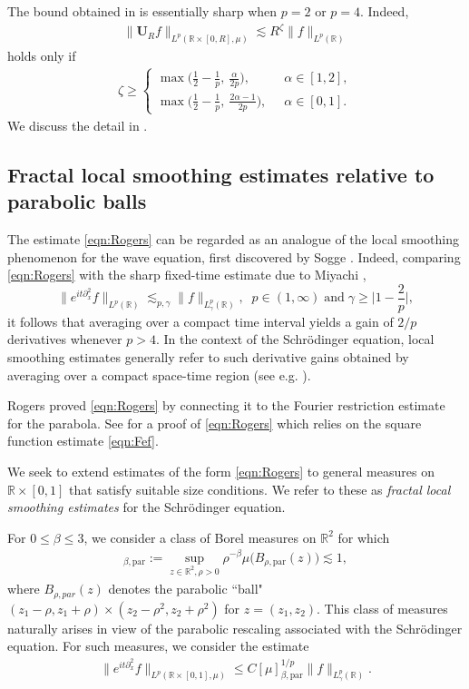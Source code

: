 \documentclass[11pt]{amsart}
\theoremstyle{definition}
\theoremstyle{remark}
\newcommand{\R}{\mathbb{R}}
\newcommand{\les}{\lesssim}
\begin{document}
The bound obtained in  is essentially sharp when $p=2$ or $p=4$. Indeed, 
\begin{align}\label{global_LS}
\big\| \mathbf{U}_R f \big\|_{L^p(\R\times[0,R], \mu)} \les  R^{\zeta} \| f\|_{L^p(\R)}
\end{align}
holds only if
\begin{align*}
\zeta \ge \begin{cases}
	\max\big(\frac12-\frac1p, ~\frac{\alpha}{2p}\big), \;\;&\alpha\in[1,2],\\[3pt]
	\max\big(\frac12-\frac1p, ~\frac{2\alpha-1}{2p}\big),\;\;&\alpha\in[0,1].
\end{cases}
\end{align*}
We discuss the detail in .

\subsection{Fractal local smoothing estimates relative to parabolic balls}
The estimate \eqref{eqn:Rogers} can be regarded as an analogue of the local smoothing phenomenon for the wave equation, first discovered by Sogge \cite{Sogge}. Indeed, comparing \eqref{eqn:Rogers} with the sharp fixed-time estimate due to Miyachi \cite{Miyachi},
\[  \| e^{it\partial_x^2}f \|_{L^p(\R)} \les_{p,\gamma} \| f\|_{L^p_\gamma(\R)}, \;\; p\in (1,\infty) \; \text{and} \; \gamma\geq  \Big|1-\frac{2}{p}\Big|,\]
it follows that averaging over a compact time interval yields a gain of $2/p$ derivatives whenever $p>4$. In the context of the Schr\"odinger equation, local smoothing estimates generally refer to such derivative gains obtained by averaging over a compact space-time region (see e.g. \cite{Sjolin}). 

Rogers \cite{Rogers} proved \eqref{eqn:Rogers} by connecting it to the Fourier restriction estimate for the parabola. See \cite{Yung} for a proof of  \eqref{eqn:Rogers} which relies on the square function estimate \eqref{eqn:Fef}. 

We seek to extend estimates of the form \eqref{eqn:Rogers} to general measures on $\R\times [0,1]$  that satisfy suitable size conditions. We refer to these as \textit{fractal local smoothing estimates} for the Schr\"odinger equation. 

For $0\leq \beta \leq 3$, we consider a class of Borel measures on $\R^2$ for which 
\begin{align*}
[\mu]_{\beta,\text{par}} := \sup_{z\in \R^2, \rho>0}  \rho^{-\beta}\mu\big(B_{\rho,\text{par}}(z)\big) \lesssim 1,
\end{align*} 
where $B_{\rho,\textit{par}}(z)$ denotes the parabolic ``ball" $(z_1-\rho,z_1+\rho)\times (z_2-\rho^2,z_2+\rho^2)$ for $z=(z_1,z_2)$.  
This class of measures naturally arises in view of the parabolic rescaling associated with the Schr\"odinger equation. For such measures, we consider the estimate
\begin{align}\label{fls_par}
\big\| e^{it\partial_x^2}f \big\|_{L^p(\R\times [0,1],\mu)}
\le C [\mu]_{\beta,\text{par}}^{1/p} \|f\|_{L_\gamma^p(\R)}.
\end{align}
\end{document}
